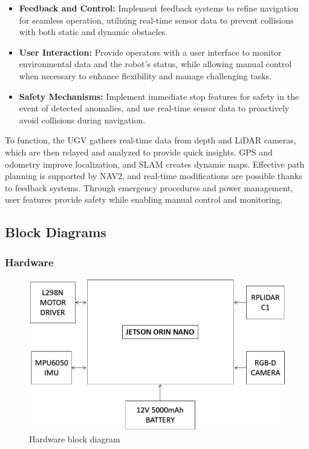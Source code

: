 {\begin{itemize}
		\item \textbf{Feedback and Control:}  Implement feedback systems to refine navigation for seamless
		operation, utilizing real-time sensor data to prevent collisions with both static and
		dynamic obstacles.
		
		\item \textbf{User Interaction:} Provide operators with a user interface to monitor environmental
		data and the robot's status, while allowing manual control when necessary to enhance
		flexibility and manage challenging tasks.
		
		\item \textbf{Safety Mechanisms:} Implement immediate stop features for safety in the event of
		detected anomalies, and use real-time sensor data to proactively avoid collisions during
		navigation.
	\end{itemize}
	
	To function, the UGV gathers real-time data from depth and LiDAR cameras, which are then
	relayed and analyzed to provide quick insights. GPS and odometry improve localization, and
	SLAM creates dynamic maps. Effective path planning is supported by NAV2, and real-time
	modifications are possible thanks to feedback systems. Through emergency procedures and
	power management, user features provide safety while enabling manual control and
	monitoring.
	

}

\subsection{Block Diagrams}

\subsubsection{Hardware}
	\begin{figure}[H]
		\centering
		\includegraphics[scale=0.4]{images/Content/Hardware_block_dia.png}
		\caption{Hardware block diagram}
		\label{fig:fig1}
	\end{figure}


